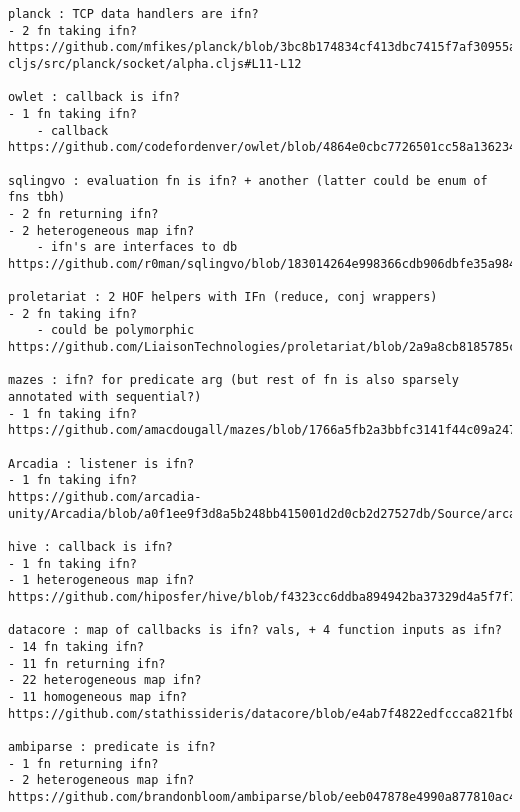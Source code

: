 \begin{verbatim}
planck : TCP data handlers are ifn?
- 2 fn taking ifn?
https://github.com/mfikes/planck/blob/3bc8b174834cf413dbc7415f7af30955adcc27b0/planck-cljs/src/planck/socket/alpha.cljs#L11-L12

owlet : callback is ifn?
- 1 fn taking ifn?
	- callback
https://github.com/codefordenver/owlet/blob/4864e0cbc7726501cc58a1362347f07f10524ed7/src/cljs/owlet/views/confirm.cljs#L12

sqlingvo : evaluation fn is ifn? + another (latter could be enum of fns tbh)
- 2 fn returning ifn?
- 2 heterogeneous map ifn?
	- ifn's are interfaces to db
https://github.com/r0man/sqlingvo/blob/183014264e998366cdb906dbfe35a984c7d5443f/src/sqlingvo/db.cljc

proletariat : 2 HOF helpers with IFn (reduce, conj wrappers)
- 2 fn taking ifn?
	- could be polymorphic
https://github.com/LiaisonTechnologies/proletariat/blob/2a9a8cb8185785cb1d12376da21ddb97d5e43d51/src/proletariat/core.clj#L566

mazes : ifn? for predicate arg (but rest of fn is also sparsely annotated with sequential?)
- 1 fn taking ifn?
https://github.com/amacdougall/mazes/blob/1766a5fb2a3bbfc3141f44c09a2477a1ec65edef/src/cljc/mazes/generators/wilson.cljc#L36

Arcadia : listener is ifn?
- 1 fn taking ifn?
https://github.com/arcadia-unity/Arcadia/blob/a0f1ee9f3d8a5b248bb415001d2d0cb2d27527db/Source/arcadia/internal/state.clj#L52

hive : callback is ifn?
- 1 fn taking ifn?
- 1 heterogeneous map ifn?
https://github.com/hiposfer/hive/blob/f4323cc6ddba894942ba37329d4a5f7f7f974024/src/hive/services/raw/location.cljs#L12

datacore : map of callbacks is ifn? vals, + 4 function inputs as ifn?
- 14 fn taking ifn?
- 11 fn returning ifn?
- 22 heterogeneous map ifn?
- 11 homogeneous map ifn?
https://github.com/stathissideris/datacore/blob/e4ab7f4822edfccca821fb8f4f9ec81a69e9d056/src/datacore/cells.clj#L59

ambiparse : predicate is ifn?
- 1 fn returning ifn?
- 2 heterogeneous map ifn?
https://github.com/brandonbloom/ambiparse/blob/eeb047878e4990a877810ac4805a45d8cfe9acfb/src/ambiparse/gll.clj#L175
\end{verbatim}
\endgroup

